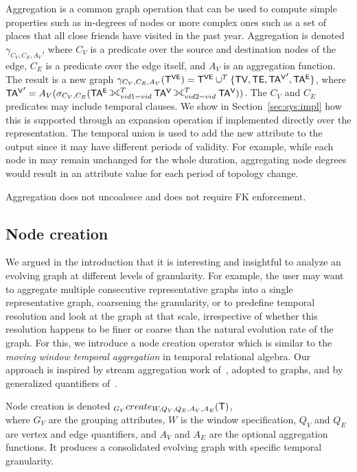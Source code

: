 Aggregation is a common graph operation that can be used to compute
simple properties such as in-degrees of nodes or more complex ones
such as a set of places that all close friends have visited in the
past year.  Aggregation is denoted $\gamma_{C_V,C_E,A_V}$, where $C_V$
is a predicate over the source and destination nodes of the edge,
$C_E$ is a predicate over the edge itself, and $A_V$ is an aggregation
function.  The result is a new graph $\gamma_{C_V,C_E,A_V} (\mathsf{T^{VE}}) =
\mathsf{T^{VE}} \cup^T \{ \textsf{TV}, \textsf{TE}, \mathsf{TA^{V}}', \mathsf{TA^{E}} \}$, where $\tav' =
A_V(\sigma_{C_V,C_E} (\tae \fullouterjoin^T_{vid1=vid} \tav
\fullouterjoin^T_{vid2=vid} \tav))$.  The $C_V$ and $C_E$ predicates
may include temporal clauses.  We show in Section~\ref{sec:sys:impl}
how this is supported through an expansion operation if implemented
directly over the \tve representation.  The temporal union is used to
add the new attribute to the output since it may have different
periods of validity.  For example, while each node in \tg may remain
unchanged for the whole duration, aggregating node degrees would
result in an attribute value for each period of topology change.

Aggregation does not uncoalesce and does not require FK enforcement.

\subsection{Node creation}
\label{sec:algebra:create}

We argued in the introduction that it is interesting and insightful to
analyze an evolving graph at different levels of granularity.  For
example, the user may want to aggregate multiple consecutive
representative graphs into a single representative graph, coarsening
the granularity, or to predefine temporal resolution and look at the
graph at that scale, irrespective of whether this resolution happens
to be finer or coarse than the natural evolution rate of the graph.
For this, we introduce a node creation operator which is similar to
the {\em moving window temporal aggregation} in temporal relational
algebra.  Our approach is inspired by stream aggregation work
of~\cite{Li2005}, adopted to graphs, and by generalized quantifiers
of~\cite{Hsu1995}.

Node creation is denoted $_{G_V}create_{W,Q_V,Q_E,A_V,A_E}
(\mathsf{T})$,\\ where $G_V$ are the grouping attributes, $W$ is the window
specification, $Q_V$ and $Q_E$ are vertex and edge quantifiers, and
$A_V$ and $A_E$ are the optional aggregation functions.  It produces a
consolidated evolving graph with specific temporal granularity.

